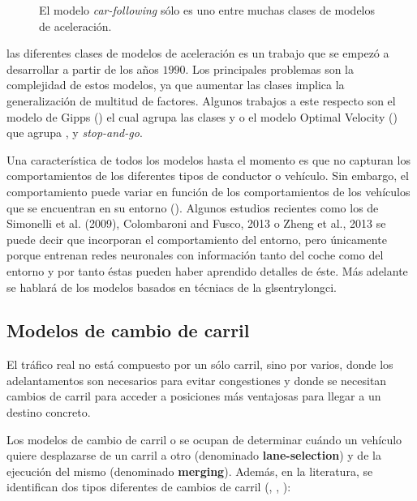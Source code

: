 \begin{figure}
	\caption{El modelo \textit{car-following} sólo es uno entre muchas clases de modelos de aceleración.}
	\label{fig:acceleration-model-classes}
\end{figure}

 las diferentes clases de modelos de aceleración es un trabajo que se empezó a desarrollar a partir de los años $1990$. Los principales problemas son la complejidad de estos modelos, ya que aumentar las clases implica la generalización de multitud de factores. Algunos trabajos a este respecto son el modelo de Gipps (\cite{Gipps1986}) el cual agrupa las clases \textit{} y \textit{} o el modelo Optimal Velocity (\cite{Bando1998}) que agrupa \textit{}, \textit{} y \textit{stop-and-go}.

Una característica de todos los modelos hasta el momento es que no capturan los comportamientos de los diferentes tipos de conductor o vehículo. Sin embargo, el comportamiento puede variar en función de los comportamientos de los vehículos que se encuentran en su entorno (\cite{Tordeux2010}). Algunos estudios recientes como los de Simonelli et al. (2009), Colombaroni and Fusco, 2013 o Zheng et al., 2013 se puede decir que incorporan el comportamiento del entorno, pero únicamente porque entrenan redes neuronales con información tanto del coche como del entorno y por tanto éstas pueden haber aprendido detalles de éste. Más adelante se hablará de los modelos basados en técniacs de la glsentrylong{ci}.

\subsection{Modelos de cambio de carril}

El tráfico real no está compuesto por un sólo carril, sino por varios, donde los adelantamentos son necesarios para evitar congestiones y donde se necesitan cambios de carril para acceder a posiciones más ventajosas para llegar a un destino concreto.

Los modelos de cambio de carril o \textit{} se ocupan de determinar cuándo un vehículo quiere desplazarse de un carril a otro (denominado \textbf{lane-selection}) y de la ejecución del mismo (denominado \textbf{merging}). Además, en la literatura, se identifican dos tipos diferentes de cambios de carril (\cite{Gipps1986}, \cite{Yang1996}, \cite{Toledo2003}):

